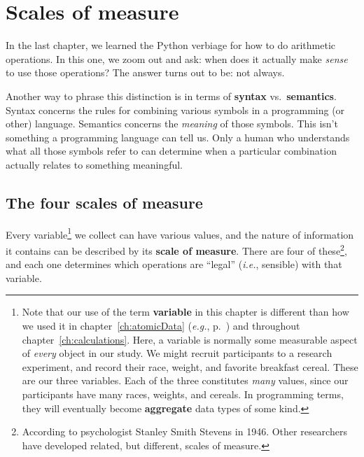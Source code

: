 


\chapter{Scales of measure}
\label{ch:scalesOfMeasure}

In the last chapter, we learned the Python verbiage for how to do arithmetic
operations. In this one, we zoom out and ask: when does it actually make
\textit{sense} to use those operations? The answer turns out to be: not always.

Another way to phrase this distinction is in terms of \textbf{syntax}
vs.~\textbf{semantics}. Syntax concerns the rules for combining various symbols
in a programming (or other) language. Semantics concerns the \textit{meaning}
of those symbols. This isn't something a programming language can tell us. Only
a human who understands what all those symbols refer to can determine when a
particular combination actually relates to something meaningful.

\section{The four scales of measure}

\label{variableDifferent}
Every variable\footnote{Note that our use of the term \textbf{variable} in this
chapter is different than how we used it in chapter~\ref{ch:atomicData}
(\textit{e.g.}, p.~\pageref{sec:envsAndVariables}) and throughout
chapter~\ref{ch:calculations}. Here, a variable is normally some measurable
aspect of \textit{every} object in our study. We might recruit participants to
a research experiment, and record their race, weight, and favorite breakfast
cereal. These are our three variables. Each of the three constitutes
\textit{many} values, since our participants have many races, weights, and
cereals. In programming terms, they will eventually become \textbf{aggregate} data types
of some kind.} we collect can have various values, and the nature of
information it contains can be described by its \textbf{scale of measure}.
There are four of these\footnote{According to psychologist Stanley Smith
Stevens in 1946. Other researchers have developed related, but different,
scales of measure.}, and each one determines which %
operations are ``legal'' (\textit{i.e.}, sensible) with that variable.


